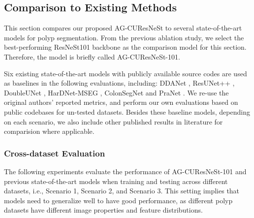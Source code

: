 \documentclass[review, sort&compress]{elsarticle}
\begin{document}
\subsection{Comparison to Existing Methods}
This section compares our proposed AG-CUResNeSt to several state-of-the-art models for polyp segmentation. From the previous ablation study, we select the best-performing ResNeSt101 backbone as the comparison model for this section. Therefore, the model is briefly called AG-CUResNeSt-101.

Six existing state-of-the-art models with publicly available source codes are used as baselines in the following evaluations, including: DDANet \cite{tomar2020ddanet}, ResUNet++ \cite{jha2019resunet++}, DoubleUNet \cite{jha2020doubleu}, HarDNet-MSEG \cite{huang2021hardnet}, ColonSegNet \cite{jha2021real} and PraNet \cite{fan2020pranet}. We re-use the original authors' reported metrics, and perform our own evaluations based on public codebases for un-tested datasets. Besides these baseline models, depending on each scenario, we also include other published results in literature for comparision where applicable.

\subsubsection{Cross-dataset Evaluation}
The following experiments evaluate the performance of AG-CUResNeSt-101 and previous state-of-the-art models when training and testing across different datasets, i.e., Scenario 1, Scenario 2, and Scenario 3. This setting implies that models need to generalize well to have good performance, as different polyp datasets have different image properties and feature distributions.
\end{document}
